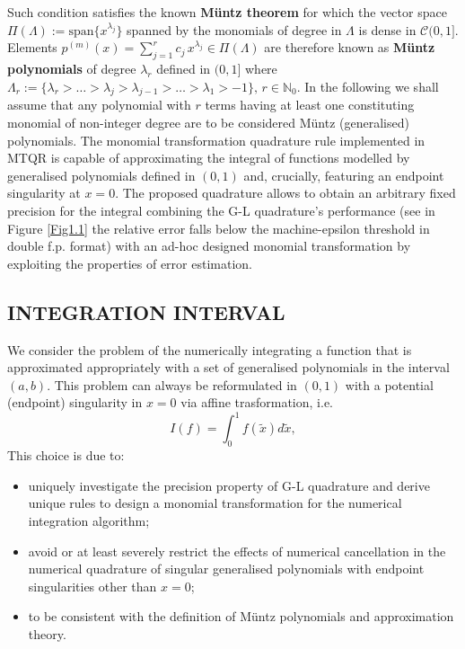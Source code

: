 \documentclass[a4paper, twosided]{book}
\begin{document}
\noindent
Such condition satisfies the known \color{poliDarkBlue} \textbf{Müntz theorem} \color{black} for which the vector space $\Pi(\Lambda):=\text{span}\{x^{\lambda_j}\}$ spanned by the monomials of degree in $\Lambda$ is dense in $\mathcal{C}(0,1]$. Elements $p^{(m)}(x) = \sum_{j=1}^{r} c_j\,x^{\lambda_j}\in\Pi(\Lambda)$ are therefore known as \color{poliDarkBlue} \textbf{Müntz polynomials} \color{black} of degree $\lambda_r$ defined in $(0,1]$ where  $\Lambda_r:=\{\lambda_r>\dots>\lambda_j>\lambda_{j-1}>\dots>\lambda_1>-1\},\, r\in\mathbb{N}_0$. In the following we shall assume that any polynomial with $r$ terms having at least one constituting monomial of non-integer degree are to be considered Müntz (generalised) polynomials. The monomial transformation quadrature rule implemented in MTQR is capable of approximating the integral of functions modelled by generalised polynomials defined in $(0,1)$ and, crucially, featuring an endpoint singularity at $x=0$. The proposed quadrature allows to obtain an arbitrary fixed precision for the integral combining the G-L quadrature's performance (see in Figure \ref{Fig1.1} the relative error falls below the machine-epsilon threshold in double f.p. format) with an ad-hoc designed monomial transformation by exploiting the properties of error estimation.



\subsection[Integration interval]{\changefont INTEGRATION INTERVAL}\label{SubSec1.2.5}

We consider the problem of the numerically integrating a function that is approximated appropriately with a set of generalised polynomials in the interval $(a,b)$. This problem can always be reformulated in $(0,1)$ with a potential (endpoint) singularity in $x=0$ via affine trasformation, i.e. 
\begin{equation}\label{eq1.11}
    I(f) = \int_0^1 f(\tilde{x}) d\tilde{x},
\end{equation}
This choice is due to:
\begin{itemize}
  \item uniquely investigate the precision property of G-L quadrature and derive unique rules to design a monomial transformation for the numerical integration algorithm;
  \item avoid or at least severely restrict the effects of numerical cancellation in the numerical quadrature of singular generalised polynomials with endpoint singularities other than $x=0$;
  \item to be consistent with the definition of Müntz polynomials and approximation theory.
\end{itemize}
\end{document}
